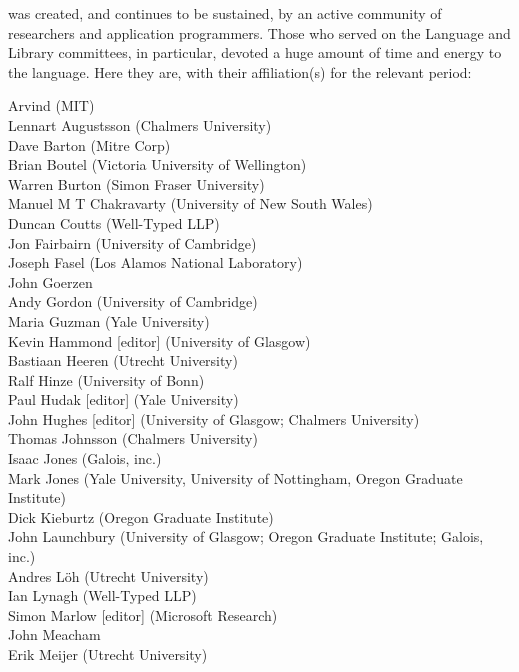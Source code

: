 \Haskell{} was created, and continues to be sustained, by an active
community of researchers and application programmers.  Those who
served on the Language and Library committees, in particular, devoted
a huge amount of time and energy to the language.  Here they are, with
their affiliation(s) for the relevant period:

\begin{center}
Arvind (MIT) \\
Lennart Augustsson (Chalmers University) \\
Dave Barton (Mitre Corp) \\
Brian Boutel (Victoria University of Wellington) \\
Warren Burton (Simon Fraser University) \\
Manuel M T Chakravarty (University of New South Wales) \\
Duncan Coutts (Well-Typed LLP) \\
Jon Fairbairn (University of Cambridge) \\
Joseph Fasel (Los Alamos National Laboratory) \\
John Goerzen \\
Andy Gordon (University of Cambridge) \\
Maria Guzman (Yale University) \\
Kevin Hammond [editor] (University of Glasgow) \\
Bastiaan Heeren (Utrecht University) \\
Ralf Hinze (University of Bonn) \\
Paul Hudak [editor] (Yale University) \\
John Hughes [editor] (University of Glasgow; Chalmers University) \\
Thomas Johnsson (Chalmers University) \\
Isaac Jones (Galois, inc.) \\
Mark Jones (Yale University, University of Nottingham, Oregon Graduate Institute) \\
Dick Kieburtz (Oregon Graduate Institute) \\
John Launchbury (University of Glasgow; Oregon Graduate Institute; Galois, inc.) \\
Andres L\"{o}h (Utrecht University) \\
Ian Lynagh (Well-Typed LLP) \\
Simon Marlow [editor] (Microsoft Research) \\
John Meacham \\
Erik Meijer (Utrecht University) \\

\end{center}
